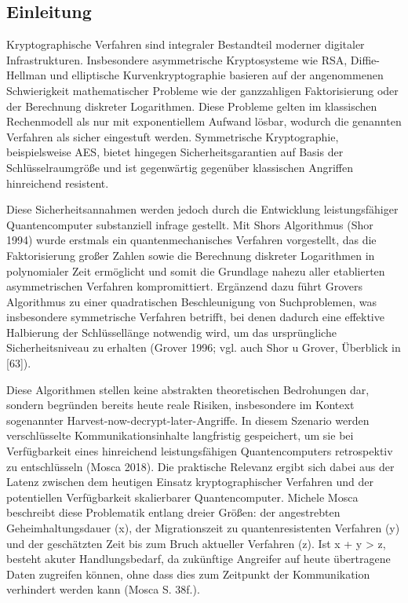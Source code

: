 \subsection{Einleitung}
Kryptographische Verfahren sind integraler Bestandteil moderner digitaler Infrastrukturen. Insbesondere asymmetrische Kryptosysteme wie RSA, Diffie-Hellman und elliptische Kurvenkryptographie basieren auf der angenommenen Schwierigkeit mathematischer Probleme wie der ganzzahligen Faktorisierung oder der Berechnung diskreter Logarithmen. Diese Probleme gelten im klassischen Rechenmodell als nur mit exponentiellem Aufwand lösbar, wodurch die genannten Verfahren als sicher eingestuft werden. Symmetrische Kryptographie, beispielsweise AES, bietet hingegen Sicherheitsgarantien auf Basis der Schlüsselraumgröße und ist gegenwärtig gegenüber klassischen Angriffen hinreichend resistent.

Diese Sicherheitsannahmen werden jedoch durch die Entwicklung leistungsfähiger Quantencomputer substanziell infrage gestellt. Mit Shors Algorithmus (Shor 1994) wurde erstmals ein quantenmechanisches Verfahren vorgestellt, das die Faktorisierung großer Zahlen sowie die Berechnung diskreter Logarithmen in polynomialer Zeit ermöglicht und somit die Grundlage nahezu aller etablierten asymmetrischen Verfahren kompromittiert. Ergänzend dazu führt Grovers Algorithmus zu einer quadratischen Beschleunigung von Suchproblemen, was insbesondere symmetrische Verfahren betrifft, bei denen dadurch eine effektive Halbierung der Schlüssellänge notwendig wird, um das ursprüngliche Sicherheitsniveau zu erhalten (Grover 1996; vgl. auch Shor u Grover, Überblick in [63]).

Diese Algorithmen stellen keine abstrakten theoretischen Bedrohungen dar, sondern begründen bereits heute reale Risiken, insbesondere im Kontext sogenannter Harvest-now-decrypt-later-Angriffe. In diesem Szenario werden verschlüsselte Kommunikationsinhalte langfristig gespeichert, um sie bei Verfügbarkeit eines hinreichend leistungsfähigen Quantencomputers retrospektiv zu entschlüsseln (Mosca 2018). Die praktische Relevanz ergibt sich dabei aus der Latenz zwischen dem heutigen Einsatz kryptographischer Verfahren und der potentiellen Verfügbarkeit skalierbarer Quantencomputer. Michele Mosca beschreibt diese Problematik entlang dreier Größen: der angestrebten Geheimhaltungsdauer (x), der Migrationszeit zu quantenresistenten Verfahren (y) und der geschätzten Zeit bis zum Bruch aktueller Verfahren (z). Ist x + y > z, besteht akuter Handlungsbedarf, da zukünftige Angreifer auf heute übertragene Daten zugreifen können, ohne dass dies zum Zeitpunkt der Kommunikation verhindert werden kann (Mosca S. 38f.).

